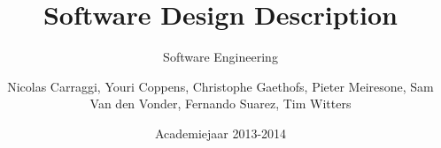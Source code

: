 \author{Nicolas Carraggi, Youri Coppens, Christophe Gaethofs, Pieter Meiresone, Sam Van den Vonder, Fernando Suarez, Tim Witters}
\title{Software Design Description}
\subtitle{Software Engineering} 
\date{Academiejaar 2013-2014}

\makeassignment

